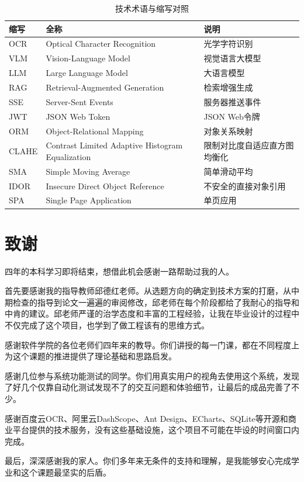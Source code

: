 \documentclass[zihao=-4,a4paper]{ctexart}
\begin{document}
\begin{table}[H]
\centering
\caption{技术术语与缩写对照}
\label{tab:glossary}
\begin{tabular}{lll}
\toprule
\textbf{缩写} & \textbf{全称} & \textbf{说明} \\
\midrule
OCR & Optical Character Recognition & 光学字符识别 \\
VLM & Vision-Language Model & 视觉语言大模型 \\
LLM & Large Language Model & 大语言模型 \\
RAG & Retrieval-Augmented Generation & 检索增强生成 \\
SSE & Server-Sent Events & 服务器推送事件 \\
JWT & JSON Web Token & JSON Web令牌 \\
ORM & Object-Relational Mapping & 对象关系映射 \\
CLAHE & Contrast Limited Adaptive Histogram Equalization & 限制对比度自适应直方图均衡化 \\
SMA & Simple Moving Average & 简单滑动平均 \\
IDOR & Insecure Direct Object Reference & 不安全的直接对象引用 \\
SPA & Single Page Application & 单页应用 \\
\bottomrule
\end{tabular}
\end{table}

\newpage
\section*{致\hspace{2em}谢}

四年的本科学习即将结束，想借此机会感谢一路帮助过我的人。

首先要感谢我的指导教师邱德红老师。从选题方向的确定到技术方案的打磨，从中期检查的指导到论文一遍遍的审阅修改，邱老师在每个阶段都给了我耐心的指导和中肯的建议。邱老师严谨的治学态度和丰富的工程经验，让我在毕业设计的过程中不仅完成了这个项目，也学到了做工程该有的思维方式。

感谢软件学院的各位老师们四年来的教导。你们讲授的每一门课，都在不同程度上为这个课题的推进提供了理论基础和思路启发。

感谢几位参与系统功能测试的同学。你们用真实用户的视角去使用这个系统，发现了好几个仅靠自动化测试发现不了的交互问题和体验细节，让最后的成品完善了不少。

感谢百度云OCR、阿里云DashScope、Ant Design、ECharts、SQLite等开源和商业平台提供的技术服务，没有这些基础设施，这个项目不可能在毕设的时间窗口内完成。

最后，深深感谢我的家人。你们多年来无条件的支持和理解，是我能够安心完成学业和这个课题最坚实的后盾。
\end{document}
